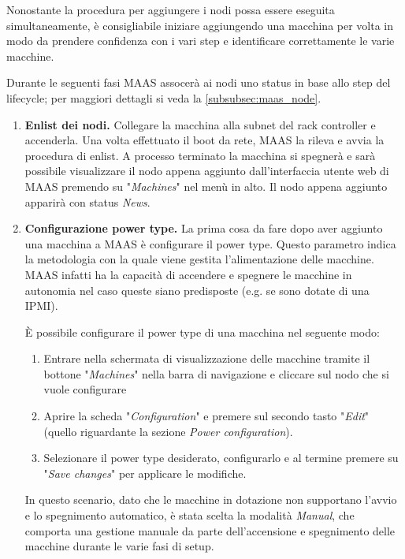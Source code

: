 \bigskip
Nonostante la procedura per aggiungere i nodi possa essere eseguita simultaneamente, è consigliabile iniziare aggiungendo una macchina per volta in modo da prendere confidenza con i vari step e identificare correttamente le varie macchine.

Durante le seguenti fasi MAAS assocerà ai nodi uno status in base allo step del lifecycle; per maggiori dettagli si veda la \cref{subsubsec:maas_node}. 
% 
\begin{enumerate}
    \item \textbf{Enlist dei nodi.} Collegare la macchina alla subnet del rack controller e accenderla.
    Una volta effettuato il boot da rete, MAAS la rileva e avvia la procedura di enlist.
    A processo terminato la macchina si spegnerà e sarà possibile visualizzare il nodo appena aggiunto dall'interfaccia utente web di MAAS premendo su "\emph{Machines}" nel menù in alto. Il nodo appena aggiunto apparirà con status \emph{News}.

    \item\label{itm:powertype} \textbf{Configurazione power type.} La prima cosa da fare dopo aver aggiunto una macchina a MAAS è configurare il power type. Questo parametro indica la metodologia con la quale viene gestita l'alimentazione delle macchine. MAAS infatti ha la capacità di accendere e spegnere le macchine in autonomia nel caso queste siano predisposte (e.g. se sono dotate di una IPMI).

    È possibile configurare il power type di una macchina nel seguente modo:
    \begin{enumerate}
        \item Entrare nella schermata di visualizzazione delle macchine tramite il bottone "\emph{Machines}" nella barra di navigazione e cliccare sul nodo che si vuole configurare
        \item Aprire la scheda "\emph{Configuration}" e premere sul secondo tasto "\emph{Edit}" (quello riguardante la sezione \emph{Power configuration}).

        \item Selezionare il power type desiderato, configurarlo e al termine premere su "\emph{Save changes}" per applicare le modifiche.
    \end{enumerate}
    In questo scenario, dato che le macchine in dotazione non supportano l'avvio e lo spegnimento automatico, è stata scelta la modalità \emph{Manual}, che comporta una gestione manuale da parte dell'accensione e spegnimento delle macchine durante le varie fasi di setup.


\end{enumerate}
